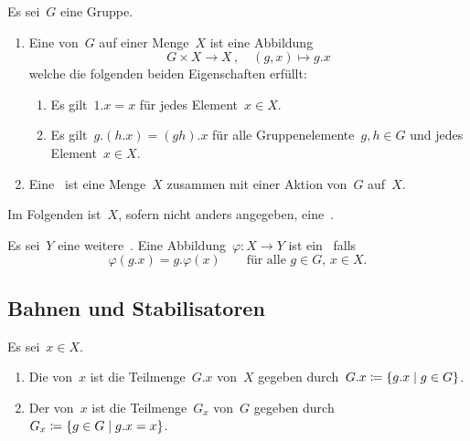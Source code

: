 \begin{definition}
  Es sei~$G$ eine Gruppe.
  \begin{enumerate}
    \item
      Eine  von~$G$ auf einer Menge~$X$  ist eine Abbildung
      \[
        G \times X \to X \,,
        \quad
        (g,x)
        \mapsto
        g.x
      \]
      welche die folgenden beiden Eigenschaften erfüllt:
      \begin{enumerate}
        \item
          Es gilt~$1.x = x$ für jedes Element~$x \in X$.
        \item
          Es gilt~$g.(h.x) = (gh).x$ für alle Gruppenelemente~$g, h \in G$ und jedes Element~$x \in X$. 
      \end{enumerate}
    \item
      Eine~ ist eine Menge~$X$ zusammen mit einer Aktion von~$G$ auf~$X$.
  \end{enumerate}
\end{definition}

\begin{convention}
  Im Folgenden ist~$X$, sofern nicht anders angegeben, eine~.
\end{convention}

\begin{definition}
  Es sei~$Y$ eine weitere~.
  Eine Abbildung~$\varphi \colon X \to Y$ ist ein~ falls
  \[
    \varphi(g.x) = g.\varphi(x)
    \qquad
    \text{für alle~$g \in G$,~$x \in X$.}
  \]
\end{definition}



\subsection{Bahnen und Stabilisatoren}

\begin{definition}
  Es sei~$x \in X$.
  \begin{enumerate}
    \item
      Die  von~$x$ ist die Teilmenge~$G.x$ von~$X$ gegeben durch~$G.x \defined \{ g.x \suchthat g \in G \}$.
    \item
      Der  von~$x$ ist die Teilmenge~$G_x$ von~$G$ gegeben durch~$G_x \defined \{ g \in G \suchthat g.x = x \}$.
  \end{enumerate}
\end{definition}

